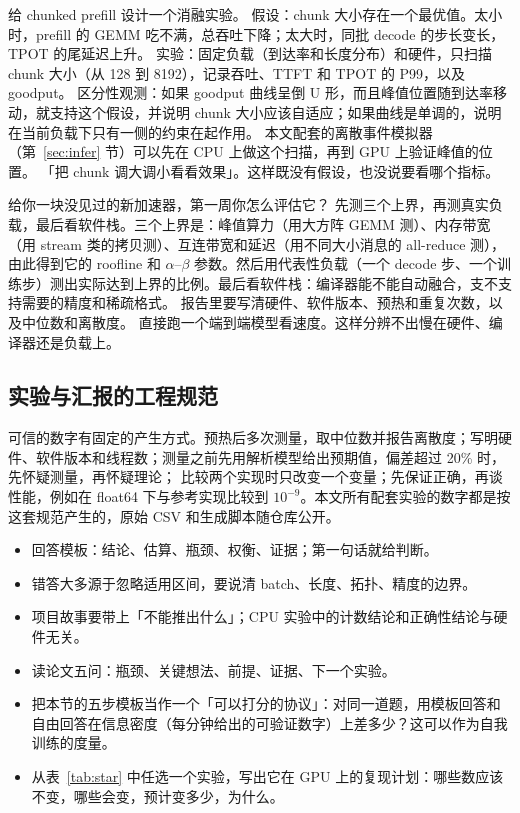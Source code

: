 \begin{qa}{给 chunked prefill 设计一个消融实验。}
\ans 假设：chunk 大小存在一个最优值。太小时，prefill 的 GEMM 吃不满，总吞吐下降；太大时，同批 decode 的步长变长，TPOT 的尾延迟上升。
实验：固定负载（到达率和长度分布）和硬件，只扫描 chunk 大小（从 128 到 8192），记录吞吐、TTFT 和 TPOT 的 P99，以及 goodput。
区分性观测：如果 goodput 曲线呈倒 U 形，而且峰值位置随到达率移动，就支持这个假设，并说明 chunk 大小应该自适应；如果曲线是单调的，说明在当前负载下只有一侧的约束在起作用。
本文配套的离散事件模拟器（第~\ref{sec:infer} 节）可以先在 CPU 上做这个扫描，再到 GPU 上验证峰值的位置。
\wrong 「把 chunk 调大调小看看效果」。这样既没有假设，也没说要看哪个指标。
\end{qa}

\begin{qa}{给你一块没见过的新加速器，第一周你怎么评估它？}
\ans 先测三个上界，再测真实负载，最后看软件栈。三个上界是：峰值算力（用大方阵 GEMM 测）、内存带宽（用 stream 类的拷贝测）、互连带宽和延迟（用不同大小消息的 all-reduce 测），
由此得到它的 roofline 和 $\alpha$--$\beta$ 参数。然后用代表性负载（一个 decode 步、一个训练步）测出实际达到上界的比例。最后看软件栈：编译器能不能自动融合，支不支持需要的精度和稀疏格式。
报告里要写清硬件、软件版本、预热和重复次数，以及中位数和离散度。
\wrong 直接跑一个端到端模型看速度。这样分辨不出慢在硬件、编译器还是负载上。
\end{qa}

\subsection{实验与汇报的工程规范}

可信的数字有固定的产生方式。预热后多次测量，取中位数并报告离散度；写明硬件、软件版本和线程数；测量之前先用解析模型给出预期值，偏差超过 20\% 时，先怀疑测量，再怀疑理论；
比较两个实现时只改变一个变量；先保证正确，再谈性能，例如在 float64 下与参考实现比较到 $10^{-9}$。本文所有配套实验的数字都是按这套规范产生的，原始 CSV 和生成脚本随仓库公开。

\begin{keypts}
\begin{itemize}
\item 回答模板：结论、估算、瓶颈、权衡、证据；第一句话就给判断。
\item 错答大多源于忽略适用区间，要说清 batch、长度、拓扑、精度的边界。
\item 项目故事要带上「不能推出什么」；CPU 实验中的计数结论和正确性结论与硬件无关。
\item 读论文五问：瓶颈、关键想法、前提、证据、下一个实验。
\end{itemize}
\end{keypts}

\begin{research}
\begin{itemize}
\item 把本节的五步模板当作一个「可以打分的协议」：对同一道题，用模板回答和自由回答在信息密度（每分钟给出的可验证数字）上差多少？这可以作为自我训练的度量。
\item 从表~\ref{tab:star} 中任选一个实验，写出它在 GPU 上的复现计划：哪些数应该不变，哪些会变，预计变多少，为什么。
\end{itemize}
\end{research}
